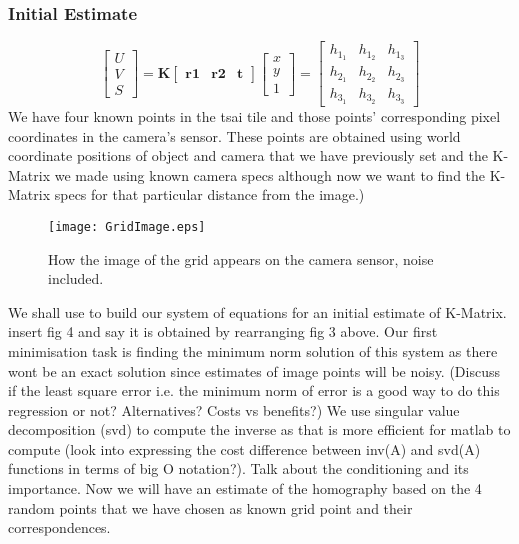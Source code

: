 \documentclass[titlepage]{article}
\begin{document}
\subsubsection{Initial Estimate}
\begin{equation}\label{uv-to-xy}
\begin{bmatrix}
  U\\ 
  V\\ 
  S 
  \end{bmatrix}
        = \textbf{K}
         \begin{bmatrix}
 \textbf{r1} & \textbf{r2} & \textbf{t}
         \end{bmatrix}
        \begin{bmatrix}
  x\\ 
  y\\ 
  1 
  \end{bmatrix}    
       =  \begin{bmatrix}
  h_1_1  & h_1_2 & h_1_3 \\ 
  h_2_1  & h_2_2 & h_2_3 \\ 
  h_3_1  & h_3_2 & h_3_3 
  \end{bmatrix}
        \end{equation}
We have four known points in the tsai tile and those points’ corresponding pixel coordinates in the camera’s sensor. These points are obtained using world coordinate positions of object and camera that we have previously set and the K-Matrix we made using known camera specs although now we want to find the K-Matrix specs for that particular distance from the image.)
%
\begin{figure}
\caption{How the image of the grid appears on the camera sensor, noise included.}\label{wrap-fig:1}
\texttt{[image: GridImage.eps]}
\end{figure}
%
We shall use to build our system of equations for an initial estimate of K-Matrix. insert fig 4 and say it is obtained by rearranging fig 3 above.
Our first minimisation task is finding the minimum norm solution of this system as there wont be an exact solution since estimates of image points will be noisy. (Discuss if the least square error i.e. the minimum norm of error is a good way to do this regression or not? Alternatives? Costs vs benefits?)
We use singular value decomposition (svd) to compute the inverse as that is more efficient for matlab to compute (look into expressing the cost difference between inv(A) and svd(A) functions in terms of big O notation?). Talk about the conditioning and its importance. Now we will have an estimate of the homography based on the 4 random points that we have chosen as known grid point and their correspondences.        
\end{document}
